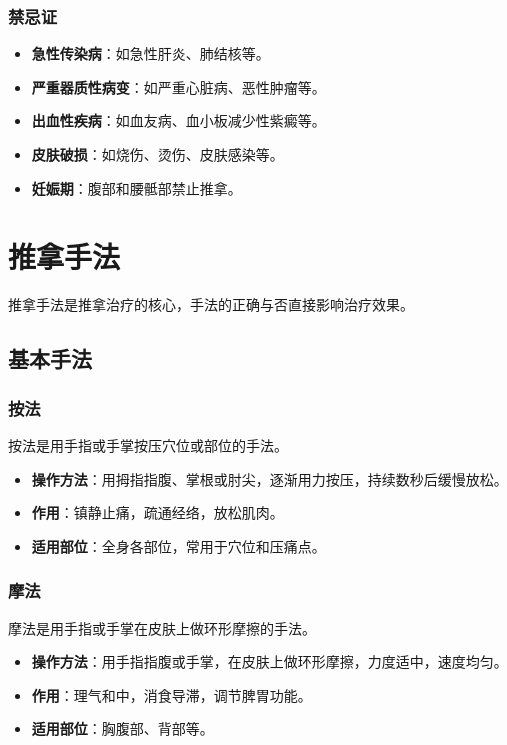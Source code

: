 \documentclass[12pt,UTF8]{ctexbook}
\begin{document}
\subsubsection{禁忌证}

\begin{itemize}
\item \textbf{急性传染病}：如急性肝炎、肺结核等。
\item \textbf{严重器质性病变}：如严重心脏病、恶性肿瘤等。
\item \textbf{出血性疾病}：如血友病、血小板减少性紫癜等。
\item \textbf{皮肤破损}：如烧伤、烫伤、皮肤感染等。
\item \textbf{妊娠期}：腹部和腰骶部禁止推拿。
\end{itemize}

\section{推拿手法}

推拿手法是推拿治疗的核心，手法的正确与否直接影响治疗效果。

\subsection{基本手法}

\subsubsection{按法}

按法是用手指或手掌按压穴位或部位的手法。

\begin{itemize}
\item \textbf{操作方法}：用拇指指腹、掌根或肘尖，逐渐用力按压，持续数秒后缓慢放松。
\item \textbf{作用}：镇静止痛，疏通经络，放松肌肉。
\item \textbf{适用部位}：全身各部位，常用于穴位和压痛点。
\end{itemize}

\subsubsection{摩法}

摩法是用手指或手掌在皮肤上做环形摩擦的手法。

\begin{itemize}
\item \textbf{操作方法}：用手指指腹或手掌，在皮肤上做环形摩擦，力度适中，速度均匀。
\item \textbf{作用}：理气和中，消食导滞，调节脾胃功能。
\item \textbf{适用部位}：胸腹部、背部等。
\end{itemize}
\end{document}
